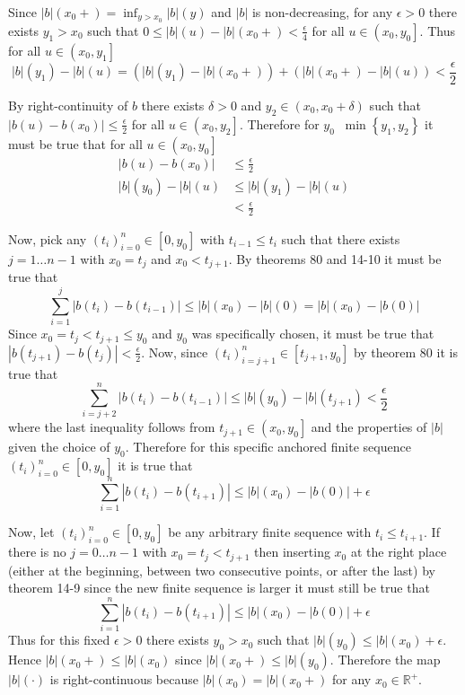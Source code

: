 \documentclass[a4paper]{article}
\newcommand{\obj}[1]{\left\{ #1 \right \}}
\newcommand{\clo}[1]{\left [ #1 \right ]}
\newcommand{\ploc}[1]{\left ( #1 \right ]}
\newcommand{\brac}[1]{\left ( #1 \right )}
\newcommand{\abs}[1]{\left | #1 \right |}
\newcommand{\Real}{\mathbb{R}}
\newcommand{\defn}{\mathop{\overset{\Delta}{=}}\nolimits}
\begin{document}
Since $\abs{b}\brac{x_0+} = \inf_{y>x_0}\abs{b}\brac{y}$ and $\abs{b}$ is non-decreasing, for any $\epsilon>0$ there exists $y_1>x_0$ such that $0\leq \abs{b}\brac{u}-\abs{b}\brac{x_0+}<\frac{\epsilon}{4}$ for all $u\in \ploc{x_0,y_0}$. Thus for all $u\in \ploc{x_0,y_1}$ \[\abs{b}\brac{y_1}-\abs{b}\brac{u} = \brac{\abs{b}\brac{y_1}-\abs{b}\brac{x_0+}}+\brac{\abs{b}\brac{x_0+}-\abs{b}\brac{u}}< \frac{\epsilon}{2}\]

By right-continuity of $b$ there exists $\delta>0$ and $y_2\in \brac{x_0,x_0+\delta}$ such that $\abs{b\brac{u}-b\brac{x_0}}\leq\frac{\epsilon}{2}$ for all $u\in\ploc{x_0,y_2}$. Therefore for $y_0\defn\min\obj{y_1,y_2}$ it must be true that for all $u\in \ploc{x_0,y_0}$ \begin{align*}\abs{b\brac{u}-b\brac{x_0}}&\leq\frac{\epsilon}{2}\\\abs{b}\brac{y_0}-\abs{b}\brac{u}&\leq\abs{b}\brac{y_1}-\abs{b}\brac{u}\\&<\frac{\epsilon}{2}\end{align*}

Now, pick any $\brac{t_i}_{i=0}^n\in\clo{0,y_0}$ with $t_{i-1}\leq t_i$ such that there exists $j=1\ldots{n-1}$ with $x_0=t_j$ and $x_0<t_{j+1}$. By theorems 80 and 14-10 it must be true that \[\sum_{i=1}^j\abs{b\brac{t_i}-b\brac{t_{i-1}}}\leq \abs{b}\brac{x_0}-\abs{b}\brac{0}=\abs{b}\brac{x_0}-\abs{b\brac{0}}\] Since $x_0=t_j<t_{j+1}\leq y_0$ and $y_0$ was specifically chosen, it must be true that $\abs{b\brac{t_{j+1}}-b\brac{t_j}}<\frac{\epsilon}{2}$. Now, since $\brac{t_i}_{i=j+1}^n\in\clo{t_{j+1},y_0}$ by theorem 80 it is true that\[\sum_{i=j+2}^n\abs{b\brac{t_i}-b\brac{t_{i-1}}}\leq \abs{b}\brac{y_0}-\abs{b}\brac{t_{j+1}}<\frac{\epsilon}{2}\] where the last inequality follows from $t_{j+1}\in\ploc{x_0, y_0}$ and the properties of $\abs{b}$ given the choice of $y_0$. Therefore for this specific anchored finite sequence $\brac{t_i}_{i=0}^n\in\clo{0,y_0}$ it is true that \[\sum_{i=1}^n\abs{b\brac{t_i}-b\brac{t_{i+1}}}\leq \abs{b}\brac{x_0}-\abs{b\brac{0}} + \epsilon\]

Now, let $\brac{t_i}_{i=0}^n\in \clo{0,y_0}$ be any arbitrary finite sequence with $t_i\leq t_{i+1}$. If there is no $j=0\ldots {n-1}$ with $x_0=t_j<t_{j+1}$ then inserting $x_0$ at the right place (either at the beginning, between two consecutive points, or after the last) by theorem 14-9 since the new finite sequence is larger it must still be true that \[\sum_{i=1}^n\abs{b\brac{t_i}-b\brac{t_{i+1}}}\leq \abs{b}\brac{x_0}-\abs{b\brac{0}} + \epsilon\] Thus for this fixed $\epsilon>0$ there exists $y_0>x_0$ such that $\abs{b}\brac{y_0}\leq \abs{b}\brac{x_0}+\epsilon$. Hence $\abs{b}\brac{x_0+}\leq \abs{b}\brac{x_0}$ since $\abs{b}\brac{x_0+}\leq \abs{b}\brac{y_0}$. Therefore the map $\abs{b}\brac{\cdot}$ is right-continuous because $\abs{b}\brac{x_0}=\abs{b}\brac{x_0+}$ for any $x_0\in \Real^+$.\\
\end{document}
